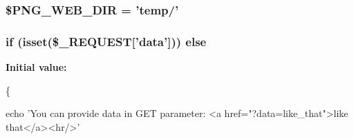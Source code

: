 \hypertarget{qr_2index_8php_a21b3ffb54edc6b2f903575fe682d56ce}{
\subsubsection[{\$\-P\-N\-G\-\_\-\-W\-E\-B\-\_\-\-D\-I\-R}]{\setlength{\rightskip}{0pt plus 5cm}\$P\-N\-G\-\_\-\-W\-E\-B\-\_\-\-D\-I\-R = 'temp/'}}\label{qr_2index_8php_a21b3ffb54edc6b2f903575fe682d56ce}
\hypertarget{qr_2index_8php_a9b82d7b40f4d9cafa83df2563d167625}{
\subsubsection[{else}]{\setlength{\rightskip}{0pt plus 5cm}if (isset(\$\-\_\-\-R\-E\-Q\-U\-E\-S\-T\mbox{[}'data'\mbox{]})) else}}\label{qr_2index_8php_a9b82d7b40f4d9cafa83df2563d167625}
{\bfseries Initial value\-:}
\begin{DoxyCode}
\{    
    
        
        echo \textcolor{stringliteral}{'You can provide data in GET parameter: <a href="?data=like\_that">like that</a><hr/>'}
\end{DoxyCode}
